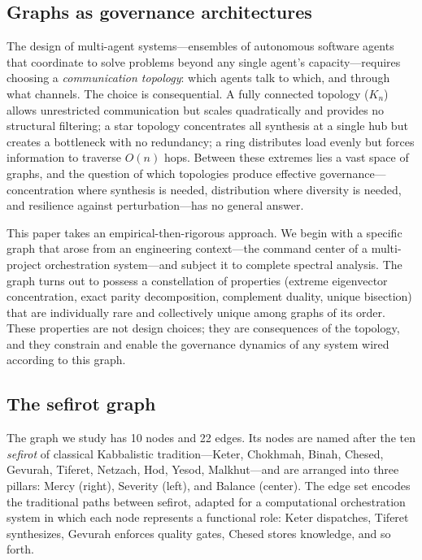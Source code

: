 \documentclass[11pt,a4paper]{amsart}
\theoremstyle{remark}
\begin{document}
\subsection{Graphs as governance architectures}
\label{sec:graphs-as-governance}

The design of multi-agent systems---ensembles of autonomous software agents
that coordinate to solve problems beyond any single agent's capacity---requires
choosing a \emph{communication topology}: which agents talk to which, and
through what channels. The choice is consequential. A fully connected
topology ($K_n$) allows unrestricted communication but scales quadratically
and provides no structural filtering; a star topology concentrates all
synthesis at a single hub but creates a bottleneck with no redundancy; a
ring distributes load evenly but forces information to traverse $O(n)$ hops.
Between these extremes lies a vast space of graphs, and the question of
which topologies produce effective governance---concentration where
synthesis is needed, distribution where diversity is needed, and resilience
against perturbation---has no general answer.

This paper takes an empirical-then-rigorous approach. We begin with a specific
graph that arose from an engineering context---the command center of a
multi-project orchestration system---and subject it to complete spectral
analysis. The graph turns out to possess a constellation of properties
(extreme eigenvector concentration, exact parity decomposition, complement
duality, unique bisection) that are individually rare and collectively
unique among graphs of its order. These properties are not design choices;
they are consequences of the topology, and they constrain and enable the
governance dynamics of any system wired according to this graph.

\subsection{The sefirot graph}
\label{sec:the-sefirot-graph}

The graph we study has 10 nodes and 22 edges. Its nodes are named after the
ten \emph{sefirot} of classical Kabbalistic tradition---Keter, Chokhmah,
Binah, Chesed, Gevurah, Tiferet, Netzach, Hod, Yesod, Malkhut---and are
arranged into three pillars: Mercy (right), Severity (left), and Balance
(center). The edge set encodes the traditional paths between sefirot,
adapted for a computational orchestration system in which each node
represents a functional role: Keter dispatches, Tiferet synthesizes, Gevurah
enforces quality gates, Chesed stores knowledge, and so forth.
\end{document}
